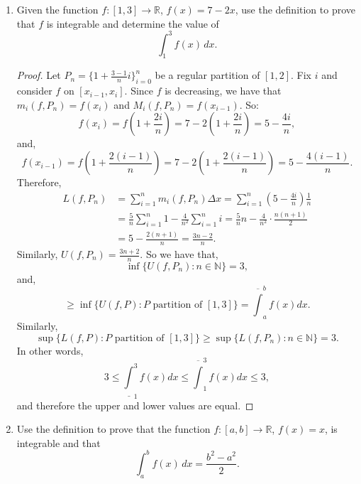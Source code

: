 \documentclass[12pt]{amsart}
\begin{document}
\begin{enumerate}
\begin{proof}
Claim: If $f$ has a critical  point at $c\in (a,b)$, (i.e., either $f'(c)$ does not exist or $f'(c)=0$) and if $f'(x)<0$ for $x<c$ and $f'(x)>0$ for $x>c$, then has a local minimum at $c$.

Suppose $f$ has a critical  point at $c\in (a,b)$ and $f'(x)<0$ for $x<c$ and $f'(x)>0$ for $x>c$. Then there exists $a,\,b \in [a,b]$ such that $f'(x) < 0$ for all $x\in (a,c)$ and $f'(x) > 0$ for all $x\in (c,b)$. By Problem 1, $f$ is decreasing on $[a,c]$ and increasing on $[c,b]$. Therefore, $f(c)$ is a minimum of $f$ on $(a,b)$.
\end{proof}

\item Given the function $f : [1,3] \rightarrow \mathbb{R}$,
  $f(x)=7-2x$, use the definition to prove that $f$ is integrable and determine the value of 
%
\[ \int_1^3  f(x) \,dx. \]

\begin{proof}
Let $P_n = \{ 1 + \tfrac {3-1} n i \}_{i=0}^n$ be a regular partition of $[1,2]$. Fix $i$ and consider $f$ on $[ x_{i-1}, x_i ]$. Since $f$ is decreasing, we have that $m_i (f,P_n) = f(x_i)$ and $M_i(f,P_n) = f(x_{i-1})$. So:
%
\[ f(x_i) = f\left(1 + \frac{2i}{n}\right) = 7 - 2\left(1 + \frac{2i}{n}\right) = 5 - \frac{4i}{n}, \]
%
and,
%
\[ f(x_{i-1}) = f\left(1 + \frac{2(i-1)}{n}\right) = 7 - 2\left(1 + \frac{2(i-1)}{n}\right) = 5 - \frac{4(i-1)}{n}. \]
%
Therefore,
%
\begin{align*}
L(f,P_n) &= \sum_{i=1}^n m_i(f,P_n) \Delta x = \sum_{i=1}^n \left(5 - \frac{4i}{n} \right) \frac 1 n \\
&= \frac 5 n \sum_{i=1}^n 1 - \frac 4 {n^2} \sum_{i=1}^n i = \frac 5 n n - \frac 4 {n^2} \cdot \frac {n(n+1)} 2 \\
&= 5 - \frac {2(n+1)}{n} = \frac {3n-2} n.
\end{align*}
%
Similarly, $U(f,P_n) = \tfrac {3n+2} n$. So we have that,
%
\[ \inf\{ U(f,P_n) : n\in\mathbb N \} = 3, \]
%
and,
%
\[ \ge \inf\{ U(f,P) : P \textrm{ partition of }[1,3] \} = \overline\int_a^b f(x)dx. \]
%
Similarly,
%
\[ \sup\{ L(f,P) : P \textrm{ partition of }[1,3] \} \ge \sup\{ L(f,P_n) : n\in\mathbb N \} = 3. \]
%
In other words,
%
\[ 3 \le \underline\int_1^3 f(x) dx \le \overline\int_1^3 f(x) dx \le 3, \]
%
and therefore the upper and lower values are equal.
\end{proof}

\item Use the definition to prove that the function $f : [a,b]
  \rightarrow \mathbb{R}$, $f(x)=x$, is integrable and that
%
\[ \int_a^b f(x)\,dx = \frac{b^2-a^2}{2}. \]


\end{enumerate}
\end{document}
